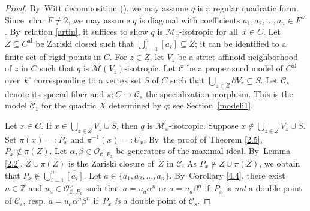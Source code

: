 \documentclass[10pt]{amsart}
\newcommand{\al}{\mathrm{al}}
\DeclareMathOperator{\Char}{char}
\theoremstyle{definition}
\begin{document}
\begin{proof}
By~Witt decomposition (\cite[I.4.1]{lam}), we may assume $q$ is a regular quadratic form. Since $\Char F \neq 2$, we may assume $q$ is diagonal with coefficients ${a_1, a_2, \dots, a_n\in F^{\times}}$. By~relation \eqref{artin}, it suffices to show $q$ is $\mathscr{M}_x$-isotropic for all~$x \in C$. Let $Z \subseteq C^{\al}$ be Zariski closed such that $\bigcup_{i=1}^n [a_i] \subseteq Z$; it can be identified to a finite set of rigid points in $C$. For $z \in Z$, let $V_z$ be a strict affinoid
neighborhood of $z$ in $C$ such that $q$ is $\mathscr{M}(V_z)$-isotropic. Let $\mathscr{C}$ be a proper sncd model of $C^{\al}$ over~$k^{\circ}$ corresponding to a vertex set $S$ of
$C$ such that $\bigcup_{z \in Z} \partial{V_z} \subseteq S$. Let $\mathscr{C}_s$ denote its special fiber and $\pi: C \to
\mathscr{C}_s$ the specialization morphism. This is the model $\mathscr{C}_1$ for the quadric $X$ determined by $q$; see Section~\ref{modeli1}.

Let $x \in C$. If $x \in \bigcup_{z \in Z}V_z \cup S$, then $q$ is $\mathscr{M}_x$-isotropic. Suppose ${x \not \in {\bigcup_{z \in Z} V_z \cup S}}$. Set $\pi(x)=:P_x$ and ${\pi^{-1}(x)=:U_x}$. By~the proof of Theorem \ref{2.5}, $P_x \not \in \pi(Z)$.
Let $\alpha, \beta \in \mathcal{O}_{\mathscr{C}, P_x}$ be generators of the maximal ideal. By~Lemma \ref{2.2}, $Z \cup \pi(Z)$ is the Zariski closure of~$Z$ in $\mathscr{C}$. As $P_x \not \in Z \cup \pi(Z)$, we obtain that $P_x \not \in \bigcup_{i=1}^n \overline{[a_i]}$. Let $a \in \{a_1, a_2, \dots, a_n\}$. By~Corollary \ref{4.4}, there exist $n \in \mathbb{Z}$ and $u_a \in \mathcal{O}_{\mathscr{C}, P_x}^{\times}$ such that $a=u_a \alpha^n$ or $a=u_a\beta^n$ if~$P_x$ is \emph{not} a double point of $\mathscr{C}_s$, resp. $a=u_a \alpha^n \beta^n$ if~$P_x$ \emph{is} a double point of $\mathscr{C}_s$.


\end{proof}
\end{document}
